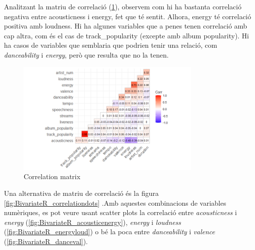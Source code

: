 Analitzant la matriu de correlació (\ref{fig:BivariateR_correlation}), observem com hi ha bastanta correlació negativa entre acousticness i energy, fet que té sentit. Alhora, energy té correlació positiva amb loudness. Hi ha algunes variables que a penes tenen correlació amb cap altra, com és el cas de track\_popularity (excepte amb album popularity). Hi ha casos de variables que semblaria que podrien tenir una relació, com \textit{danceability} i \textit{energy}, però que resulta que no la tenen.

\begin{figure}[H]
    \centering
    \includegraphics[width=0.8\textwidth]{Images/2_Bivariate/correlationvalues.png}
    \caption{Correlation matrix}
    \label{fig:BivariateR_correlation}
\end{figure}

Una alternativa de matriu de correlació és la figura \ref{fig:BivariateR_correlationdots} .Amb aquestes combinacions de variables numèriques, es pot veure usant scatter plots la correlació entre \textit{acousticness} i \textit{energy} (\ref{fig:BivariateR_acousticenergy}), \textit{energy} i \textit{loudness} (\ref{fig:BivariateR_energyloud}) o bé la poca entre \textit{danceability} i \textit{valence} (\ref{fig:BivariateR_danceval}).

